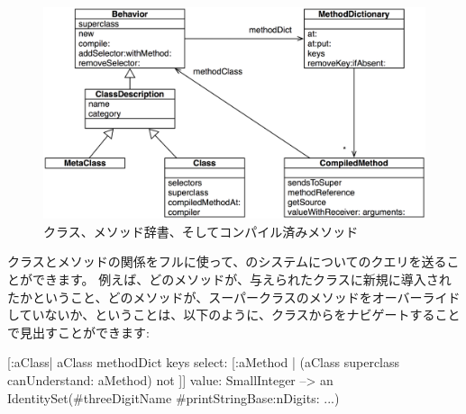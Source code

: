 \documentclass[a4paper,10pt,twoside]{book}
\begin{document}
\begin{figure}[ht]\centering
	\includegraphics[width=\linewidth]{MethodsAsObjects}
	\caption{クラス、メソッド辞書、そしてコンパイル済みメソッド\figlabel{MethodsAsObjects}}
\end{figure}

クラスとメソッドの関係をフルに使って、\pharo のシステムについてのクエリを送ることができます。
例えば、どのメソッドが、与えられたクラスに新規に導入されたかということ、\ie どのメソッドが、スーパークラスのメソッドをオーバーライドしていないか、ということは、以下のように、クラスからをナビゲートすることで見出すことができます:
\begin{code}{}
[:aClass| aClass methodDict keys select: [:aMethod |
  (aClass superclass canUnderstand: aMethod) not ]] value: SmallInteger
  --> an IdentitySet(#threeDigitName #printStringBase:nDigits: ...)
\end{code}
\end{document}

